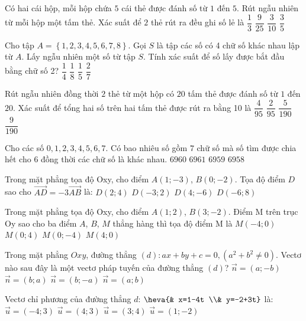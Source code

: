 \begin{ex}
Có hai cái hộp, mỗi hộp chứa $5$ cái thẻ được đánh số từ $1$ đến $5$. Rút ngẫu nhiên từ mỗi hộp một tấm thẻ. Xác suất để $2$ thẻ rút ra đều ghi số lẻ là
\choice
{$\dfrac{1}{3}$}
{\True $\dfrac{9}{25}$}
{$\dfrac{3}{10}$}
{$\dfrac{3}{5}$}
\end{ex}
\begin{ex}
Cho tập $A=\left\{ 1{,}2,3{,}4,5{,}6,7{,}8 \right\}$. Gọi $S$ là tập các số có 4 chữ số khác nhau lập từ $A$. Lấy ngẫu nhiên một số từ tập $S$. Tính xác suất để số lấy được bắt đầu bằng chữ số 2?
\choice
{$\dfrac{1}{4}$}
{\True $\dfrac{1}{8}$}
{$\dfrac{1}{5}$}
{$\dfrac{2}{7}$}
\end{ex}
\begin{ex}
Rút ngẫu nhiên đồng thời $2$ thẻ từ một hộp có $20$ tấm thẻ được đánh số từ $1$ đến $20$. Xác suất để tổng hai số trên hai tấm thẻ được rút ra bằng 10 là
\choice
{$\dfrac{4}{95}$}
{\True $\dfrac{2}{95}$}
{$\dfrac{5}{190}$}
{$\dfrac{9}{190}$}
\end{ex}
\begin{ex}
Cho các số $0{,}1,2{,}3,4{,}5,6{,}7$. Có bao nhiêu số gồm $7$ chữ số mà số tìm được chia hết cho $6$ đồng thời các chữ số là khác nhau.
\choice
{\True $6960$}
{$6961$}
{$6959$}
{$6958$}
\end{ex}
\begin{ex}
Trong mặt phẳng tọa độ Oxy, cho điểm $A(1;-3)$, $B(0;-2)$. Tọa độ điểm $D$ sao cho $\vec{AD}=-3\vec{AB}$ là:
\choice
{$D(2;4)$}
{$D(-3;2)$}
{\True $D(4;-6)$}
{$D(-6;8)$}
\end{ex}
\begin{ex}
Trong mặt phẳng tọa độ Oxy, cho điểm $A(1;2)$, $B(3;-2)$. Điểm M trên trục Oy sao cho ba điểm $A$, $B$, $M$ thẳng hàng thì tọa độ điểm M là
\choice
{$M(-4;0)$}
{\True $M(0;4)$}
{$M(0;-4)$}
{$M(4;0)$}
\end{ex}
\begin{ex}
Trong mặt phẳng $Oxy$, đường thẳng $(d)\colon ax+by+c=0,\left(a^2+b^2\ne 0\right)$. Vectơ nào sau đây là một vectơ pháp tuyến của đường thẳng $(d)$?
\choice
{$\vec{n}=(a;-b)$}
{$\vec{n}=(b;a)$}
{$\vec{n}=(b;-a)$}
{\True $\vec{n}=(a;b)$}
\end{ex}
\begin{ex}
Vectơ chỉ phương của đường thẳng $d$: $\heva{& x=1-4t \\& y=-2+3t}$ là:
\choice
{\True $\vec{u}=(-4;3)$}
{$\vec{u}=(4;3)$}
{$\vec{u}=(3;4)$}
{$\vec{u}=(1;-2)$}
\end{ex}
